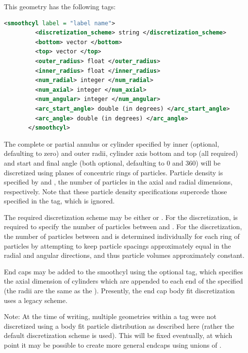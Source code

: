 This geometry has the following tags:

\begin{lstlisting}[language=XML]
	   <smoothcyl label = "label name">
	     <discretization_scheme> string </discretization_scheme>
	     <bottom> vector </bottom>
	     <top> vector </top>
	     <outer_radius> float </outer_radius>
	     <inner_radius> float </inner_radius>
	     <num_radial> integer </num_radial>
	     <num_axial> integer </num_axial>
	     <num_angular> integer </num_angular>
	     <arc_start_angle> double (in degrees) </arc_start_angle>
	     <arc_angle> double (in degrees) </arc_angle>
	   </smoothcyl>
\end{lstlisting}

The complete or partial annulus or cylinder specified by inner
(optional, defaulting to zero) and outer radii, cylinder axis bottom
and top (all required) and start and final angle (both optional,
defaulting to 0 and 360) will be discretized using planes of
concentric rings of particles.  Particle density is specified by  and , the number of
particles in the axial and radial dimensions, respectively.
  Note that these particle density specifications
supercede those specified in the 
tag, which is ignored.

The required discretization scheme may be either 
 or .  For the
 discretization,   is required to specify the number of particles between  and .  For the  discretization, the number of
particles between  and 
is determined individually for each ring of particles by
attempting to keep particle spacings approximately equal in the radial
and angular directions, and thus particle volumes approximately
constant.

End caps may be added to the smoothcyl using the optional  tag, which specifies the axial
dimension of cylinders which are appended to each end of the specified
 (the radii are the same as the 
).  Presently, the end cap body fit discretization uses a
legacy scheme.

Note: At the time of writing, multiple 
geometries within a  tag were not
discretized using a body fit particle distribution as described here
(rather the default discretization scheme is used).  This will be
fixed eventually, at which point it may be possible to create more
general endcaps using unions of .

